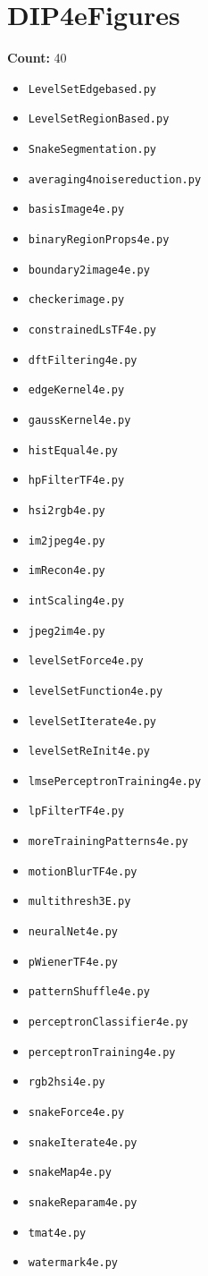 \documentclass[11pt]{article}
\begin{document}
\section*{DIP4eFigures}
\textbf{Count:} 40
\begin{itemize}[leftmargin=1.5em]
\item \texttt{LevelSetEdgebased.py}
\item \texttt{LevelSetRegionBased.py}
\item \texttt{SnakeSegmentation.py}
\item \texttt{averaging4noisereduction.py}
\item \texttt{basisImage4e.py}
\item \texttt{binaryRegionProps4e.py}
\item \texttt{boundary2image4e.py}
\item \texttt{checkerimage.py}
\item \texttt{constrainedLsTF4e.py}
\item \texttt{dftFiltering4e.py}
\item \texttt{edgeKernel4e.py}
\item \texttt{gaussKernel4e.py}
\item \texttt{histEqual4e.py}
\item \texttt{hpFilterTF4e.py}
\item \texttt{hsi2rgb4e.py}
\item \texttt{im2jpeg4e.py}
\item \texttt{imRecon4e.py}
\item \texttt{intScaling4e.py}
\item \texttt{jpeg2im4e.py}
\item \texttt{levelSetForce4e.py}
\item \texttt{levelSetFunction4e.py}
\item \texttt{levelSetIterate4e.py}
\item \texttt{levelSetReInit4e.py}
\item \texttt{lmsePerceptronTraining4e.py}
\item \texttt{lpFilterTF4e.py}
\item \texttt{moreTrainingPatterns4e.py}
\item \texttt{motionBlurTF4e.py}
\item \texttt{multithresh3E.py}
\item \texttt{neuralNet4e.py}
\item \texttt{pWienerTF4e.py}
\item \texttt{patternShuffle4e.py}
\item \texttt{perceptronClassifier4e.py}
\item \texttt{perceptronTraining4e.py}
\item \texttt{rgb2hsi4e.py}
\item \texttt{snakeForce4e.py}
\item \texttt{snakeIterate4e.py}
\item \texttt{snakeMap4e.py}
\item \texttt{snakeReparam4e.py}
\item \texttt{tmat4e.py}
\item \texttt{watermark4e.py}
\end{itemize}
\end{document}
